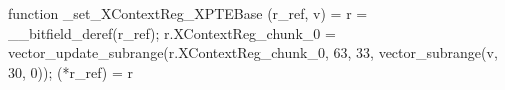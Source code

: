 function _set_XContextReg_XPTEBase (r_ref, v) = {
    r = __bitfield_deref(r_ref);
    r.XContextReg_chunk_0 = vector_update_subrange(r.XContextReg_chunk_0, 63, 33, vector_subrange(v, 30, 0));
    (*r_ref) = r
}
